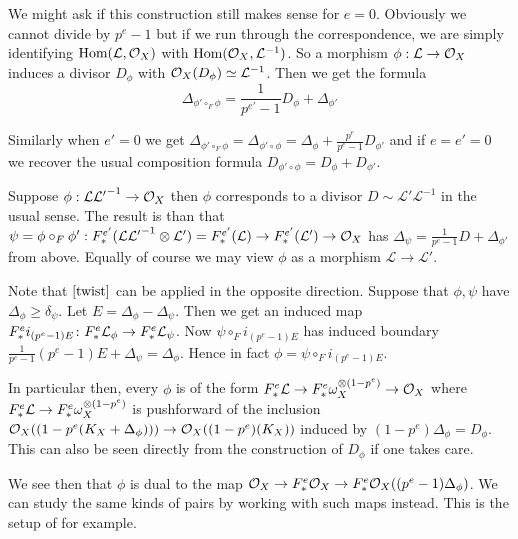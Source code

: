 \begin{remark}\label{R-twist}

We might ask if this construction still makes sense for $e=0$. Obviously we cannot divide by $p^{e}-1$ but if we run through the correspondence, we are simply identifying $\textup{Hom}(\mathcal{L},\mathcal{O}_{X})$ with $\textup{Hom}(\mathcal{O}_{X},\mathcal{L}^{-1})$. So a morphism $\phi: \mathcal{L} \to \mathcal{O}_{X}$ induces a divisor $D_{\phi}$ with $\mathcal{O}_{X}(D_{\phi})\simeq \mathcal{L}^{-1}$. Then we get the formula
\[\Delta_{\phi' \circ_{F} \phi}= \frac{1}{p^{e'}-1}D_{\phi} + \Delta_{\phi'}\]

Similarly when $e'=0$ we get $\Delta_{\phi' \circ_{F} \phi}=\Delta_{\phi' \circ \phi}=\Delta_{\phi} + \frac{p^{e}}{p^{e}-1}D_{\phi'}$ and if $e=e'=0$ we recover the usual composition formula $D_{\phi' \circ \phi}=D_{\phi} + D_{\phi'}$.

Suppose $\phi: \mathcal{L}\mathcal{L'}^{-1} \to \mathcal{O}_{X}$ then $\phi$ corresponds to a divisor $D\sim \mathcal{L'}\mathcal{L}^{-1}$ in the usual sense. The result is than that $\psi=\phi \circ_{F} \phi': F_{*}^{e'}(\mathcal{L}\mathcal{L'}^{-1} \otimes \mathcal{L'})=F_{*}^{e'}(\mathcal{L}) \to F_{*}^{e'}(\mathcal{L'})\to\mathcal{O}_{X}$ has $\Delta_{\psi}=\frac{1}{p^{e}-1}D+\Delta_{\phi'}$ from above. Equally of course we may view $\phi$ as a morphism $\mathcal{L} \to \mathcal{L'}$. 

\end{remark}

Note that $\autoref{twist}$ can be applied in the opposite direction. Suppose that $\phi,\psi$ have $\Delta_{\phi} \geq \delta_{\psi}$. Let $E=\Delta_{\phi}-\Delta_{\psi}$. Then we get an induced map $F^{e}_{*} i_{(p^{e}-1)E} \colon F^{e}_{*} \mathcal{L}_{\phi} \to F^{e}_{*} \mathcal{L}_{\psi}$. Now $\psi \circ_{F} i_{(p^{e}-1)E}$ has induced boundary $\frac{1}{p^{e}-1}(p^{e}-1)E+\Delta_{\psi}=\Delta_{\phi}$. Hence in fact $\phi=\psi \circ_{F} i_{(p^{e}-1)E}$.

In particular then, every $\phi$ is of the form $F^{e}_{*} \mathcal{L} \to F^{e}_{*} \omega_{X}^{\otimes(1-p^{e})} \to \mathcal{O}_{X}$ where $F^{e}_{*} \mathcal{L} \to F^{e}_{*} \omega_{X}^{\otimes(1-p^{e})}$ is pushforward of the inclusion $\mathcal{O}_{X}((1-p^{e}(K_{X}+\Delta_{\phi}))) \to \mathcal{O}_{X}((1-p^{e})(K_{X}))$ induced by $(1-p^{e})\Delta_{\phi}=D_{\phi}$. This can also be seen directly from the construction of $D_{\phi}$ if one takes care.

We see then that $\phi$ is dual to the map $\mathcal{O}_{X} \to F^{e}_{*}\mathcal{O}_{X} \to F^{e}_{*}\mathcal{O}_{X}((p^{e}-1)\Delta_{\phi})$. We can study the same kinds of pairs by working with such maps instead. This is the setup of \cite{schwede2010globally} for example.


